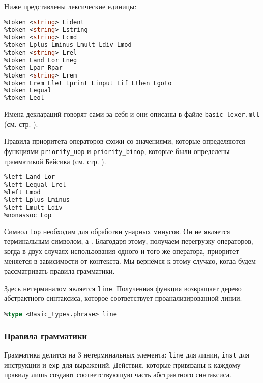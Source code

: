 Ниже представлены лексические единицы:

\begin{lstlisting}[language=OCaml]
%token <int> Lint
%token <string> Lident
%token <string> Lstring
%token <string> Lcmd
%token Lplus Lminus Lmult Ldiv Lmod
%token <string> Lrel
%token Land Lor Lneg
%token Lpar Rpar
%token <string> Lrem
%token Lrem Llet Lprint Linput Lif Lthen Lgoto
%token Lequal
%token Leol
\end{lstlisting}

Имена деклараций говорят сами за себя и они описаны в файле
\texttt{basic\_lexer.mll} (см. стр. \pageref{??}).

Правила приоритета операторов схожи со значениями, которые определяются
функциями \texttt{priority\_uop} и \texttt{priority\_binop}, которые были
определены грамматикой Бейсика (см. стр. \pageref{??}).

\begin{lstlisting}[language=OCaml]
%right Lneg
%left Land Lor
%left Lequal Lrel
%left Lmod
%left Lplus Lminus
%left Lmult Ldiv
%nonassoc Lop
\end{lstlisting}

Символ \texttt{Lop} необходим для обработки унарных минусов. Он не является
терминальным символом, а . Благодаря этому, получаем
перегрузку операторов, когда в двух случаях использования одного и того же
оператора, приоритет меняется в зависимости от контекста. Мы вернёмся к этому
случаю, когда будем рассматривать правила грамматики.

Здесь нетерминалом является \texttt{line}. Полученная функция возвращает дерево
абстрактного синтаксиса, которое соответствует проанализированной линии.

\begin{lstlisting}[language=OCaml]
%start line
%type <Basic_types.phrase> line
\end{lstlisting}

\subsubsection{Правила грамматики}

Грамматика делится на 3 нетерминальных элемента: \texttt{line} для линии,
\texttt{inst} для инструкции и \texttt{exp} для выражений. Действия, которые
привязаны к каждому правилу лишь создают соответствующую часть абстрактного
синтаксиса.

